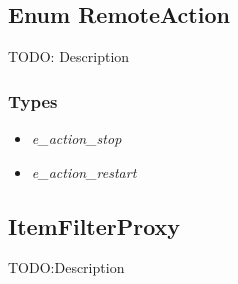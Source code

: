 
\subsection{Enum RemoteAction}
TODO: Description
\subsubsection{Types}
\begin{itemize}
	\item \textit{e\_action\_stop}\\
	
	\item \textit{e\_action\_restart}\\
	
\end{itemize}

\subsection{ItemFilterProxy}
TODO:Description
